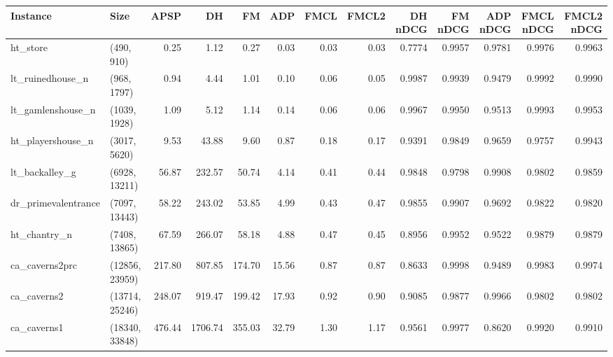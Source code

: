 \begin{tabular}{llrrrrrrrrrrr}
\toprule
           Instance &           Size &   APSP &      DH &     FM &   ADP &  FMCL &  FMCL2 &  DH nDCG &  FM nDCG &  ADP nDCG &  FMCL nDCG &  FMCL2 nDCG \\
\midrule
           ht\_store &     (490, 910) &   0.25 &    1.12 &   0.27 &  0.03 &  0.03 &   0.03 &   0.7774 &   0.9957 &    0.9781 &     0.9976 &      0.9963 \\
   lt\_ruinedhouse\_n &    (968, 1797) &   0.94 &    4.44 &   1.01 &  0.10 &  0.06 &   0.05 &   0.9987 &   0.9939 &    0.9479 &     0.9992 &      0.9990 \\
  lt\_gamlenshouse\_n &   (1039, 1928) &   1.09 &    5.12 &   1.14 &  0.14 &  0.06 &   0.06 &   0.9967 &   0.9950 &    0.9513 &     0.9993 &      0.9953 \\
  ht\_playershouse\_n &   (3017, 5620) &   9.53 &   43.88 &   9.60 &  0.87 &  0.18 &   0.17 &   0.9391 &   0.9849 &    0.9659 &     0.9757 &      0.9943 \\
     lt\_backalley\_g &  (6928, 13211) &  56.87 &  232.57 &  50.74 &  4.14 &  0.41 &   0.44 &   0.9848 &   0.9798 &    0.9908 &     0.9802 &      0.9859 \\
dr\_primevalentrance &  (7097, 13443) &  58.22 &  243.02 &  53.85 &  4.99 &  0.43 &   0.47 &   0.9855 &   0.9907 &    0.9692 &     0.9822 &      0.9820 \\
       ht\_chantry\_n &  (7408, 13865) &  67.59 &  266.07 &  58.18 &  4.88 &  0.47 &   0.45 &   0.8956 &   0.9952 &    0.9522 &     0.9879 &      0.9879 \\
     ca\_caverns2prc & (12856, 23959) & 217.80 &  807.85 & 174.70 & 15.56 &  0.87 &   0.87 &   0.8633 &   0.9998 &    0.9489 &     0.9983 &      0.9974 \\
        ca\_caverns2 & (13714, 25246) & 248.07 &  919.47 & 199.42 & 17.93 &  0.92 &   0.90 &   0.9085 &   0.9877 &    0.9966 &     0.9802 &      0.9802 \\
        ca\_caverns1 & (18340, 33848) & 476.44 & 1706.74 & 355.03 & 32.79 &  1.30 &   1.17 &   0.9561 &   0.9977 &    0.8620 &     0.9920 &      0.9910 \\
\bottomrule
\end{tabular}
